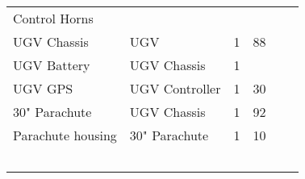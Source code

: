 \documentclass[]{auvsi_doc}
\begin{document}
\begin{table}[h!]
\begin{center}
\begin{tabularx}{\textwidth}{l l l l l l}
			Control Horns  &   &   &   &   &   \\ 
			UGV Chassis & UGV & 1 & 88 &   &   \\
			UGV Battery  & UGV Chassis & 1 &  &   &   \\
			UGV GPS  & UGV Controller & 1 & 30 &  &   \\
			30" Parachute  & UGV Chassis & 1 & 92 &  &   \\
			Parachute housing  & 30" Parachute & 1 & 10 &   &   \\
			  &   &   &   &   &   \\
			  &   &   &   &   &   \\
			  &   &   &   &   &   \\ 
			  &   &   &   &   &   \\
			  &   &   &   &   &   \\
			\bottomrule
		\end{tabularx}
	\end{center}
\end{table}
\end{document}
